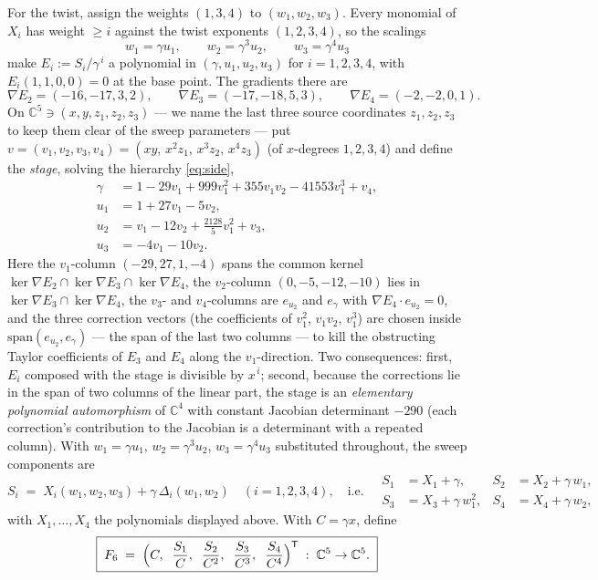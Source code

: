 \documentclass[11pt]{article}
\theoremstyle{plain}
\theoremstyle{definition}
\theoremstyle{remark}
\newcommand{\C}{\mathbb{C}}
\begin{document}
For the twist, assign the weights $(1,3,4)$ to $(w_1,w_2,w_3)$. Every monomial of
$X_i$ has weight $\ge i$ against the twist exponents $(1,2,3,4)$, so the
scalings
\[
w_1=\gamma u_1,\qquad w_2=\gamma^3u_2,\qquad w_3=\gamma^4u_3
\]
make $E_i:=S_i/\gamma^{\,i}$ a polynomial in $(\gamma,u_1,u_2,u_3)$ for
$i=1,2,3,4$, with $E_i(1,1,0,0)=0$ at the base point. The gradients there are
\[
\nabla E_2=(-16,-17,3,2),\qquad
\nabla E_3=(-17,-18,5,3),\qquad
\nabla E_4=(-2,-2,0,1).
\]
On $\C^5\ni(x,y,z_1,z_2,z_3)$ --- we name the last three source coordinates
$z_1,z_2,z_3$ to keep them clear of the sweep parameters --- put $v=(v_1,v_2,v_3,v_4)=(xy,\,x^2z_1,\,x^3z_2,\,x^4z_3)$
(of $x$-degrees $1,2,3,4$) and define the \emph{stage}, solving the
hierarchy \eqref{eq:side},
\[
\begin{aligned}
\gamma&=1-29v_1+999v_1^2+355v_1v_2-41553v_1^3+v_4,\\
u_1&=1+27v_1-5v_2,\\
u_2&=v_1-12v_2+\tfrac{2128}{5}v_1^2+v_3,\\
u_3&=-4v_1-10v_2 .
\end{aligned}
\]
Here the $v_1$-column $(-29,27,1,-4)$ spans the common kernel
$\ker\nabla E_2\cap\ker\nabla E_3\cap\ker\nabla E_4$, the $v_2$-column
$(0,-5,-12,-10)$ lies in $\ker\nabla E_3\cap\ker\nabla E_4$, the $v_3$- and
$v_4$-columns are $e_{u_2}$ and $e_\gamma$ with
$\nabla E_4\cdot e_{u_2}=0$, and the three correction vectors (the
coefficients of $v_1^2$, $v_1v_2$, $v_1^3$) are chosen inside
$\mathrm{span}(e_{u_2},e_\gamma)$ --- the span of the last two columns --- to
kill the obstructing Taylor coefficients of $E_3$ and $E_4$ along the
$v_1$-direction. Two consequences: first, $E_i$ composed with the stage is
divisible by $x^{\,i}$; second, because the corrections lie in the span of two
columns of the linear part, the stage is an \emph{elementary polynomial
automorphism} of $\C^4$ with constant Jacobian determinant $-290$ (each
correction's contribution to the Jacobian is a determinant with a repeated
column). With $w_1=\gamma u_1$, $w_2=\gamma^3u_2$, $w_3=\gamma^4u_3$ substituted
throughout, the sweep components are
\[
S_i\;=\;X_i(w_1,w_2,w_3)+\gamma\,\Delta_i(w_1,w_2)\quad(i=1,2,3,4),
\quad\text{i.e.}\quad
\begin{aligned}
S_1&=X_1+\gamma, & S_2&=X_2+\gamma\,w_1,\\
S_3&=X_3+\gamma\,w_1^2, & S_4&=X_4+\gamma\,w_2 ,
\end{aligned}
\]
with $X_1,\dots,X_4$ the polynomials displayed above. With $C=\gamma x$, define
\[
\boxed{\;F_6\;=\;\Bigl(C,\;\;\frac{S_1}{C},\;\;\frac{S_2}{C^2},\;\;
\frac{S_3}{C^3},\;\;\frac{S_4}{C^4}\Bigr)^{\mathsf T}\;:\;\C^5\to\C^5 .\;}
\]
\end{document}
